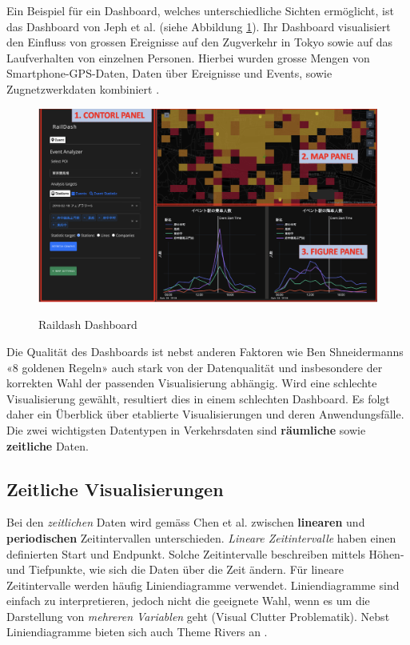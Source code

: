 Ein Beispiel für ein Dashboard, welches unterschiedliche Sichten ermöglicht, ist das Dashboard von Jeph et al. (siehe Abbildung \ref{fig_raildash}). Ihr Dashboard visualisiert den Einfluss von grossen Ereignisse auf den Zugverkehr in Tokyo sowie auf das Laufverhalten von einzelnen Personen. Hierbei wurden grosse Mengen von Smartphone-GPS-Daten, Daten über Ereignisse und Events, sowie Zugnetzwerkdaten kombiniert \parencite{raildash_2022}.

\begin{figure}[H]
    \caption{Raildash Dashboard \parencite[S. 93]{raildash_2022}}
    \includegraphics[width=.5\linewidth]{content/00_assets/raildash.png}
    \label{fig_raildash}
\end{figure}

Die Qualität des Dashboards ist nebst anderen Faktoren wie Ben Shneidermanns «8 goldenen Regeln» \parencite{golden_rules_dashboard} auch stark von der Datenqualität und insbesondere der korrekten Wahl der passenden Visualisierung abhängig. Wird eine schlechte Visualisierung gewählt, resultiert dies in einem schlechten Dashboard. Es folgt daher ein Überblick über etablierte Visualisierungen und deren Anwendungsfälle. Die zwei wichtigsten Datentypen in Verkehrsdaten sind \textbf{räumliche} sowie \textbf{zeitliche} Daten. 

\subsection{Zeitliche Visualisierungen}
Bei den \textit{zeitlichen} Daten wird gemäss Chen et al. zwischen \textbf{linearen} und \textbf{periodischen} Zeitintervallen unterschieden. \textit{Lineare Zeitintervalle} haben einen definierten Start und Endpunkt. Solche Zeitintervalle beschreiben mittels Höhen- und Tiefpunkte, wie sich die Daten über die Zeit ändern. Für lineare Zeitintervalle werden häufig Liniendiagramme verwendet. Liniendiagramme sind einfach zu interpretieren, jedoch nicht die geeignete Wahl, wenn es um die Darstellung von \textit{mehreren Variablen} geht (Visual Clutter Problematik). Nebst Liniendiagramme bieten sich auch Theme Rivers an \parencite[S. 2973]{survey_traffic_data_visualization_2015}.

